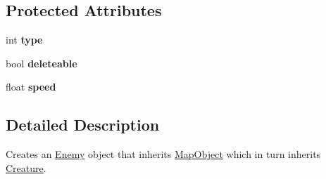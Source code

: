 \subsection*{Protected Attributes}
\begin{DoxyCompactItemize}
\item 
\hypertarget{class_enemy_a787a7113c7a5b1119ac3945fb1fb2956}{int {\bfseries type}}\label{class_enemy_a787a7113c7a5b1119ac3945fb1fb2956}

\item 
\hypertarget{class_enemy_adcb5629c5c048d9a04125cb1b0c911ef}{bool {\bfseries deleteable}}\label{class_enemy_adcb5629c5c048d9a04125cb1b0c911ef}

\item 
\hypertarget{class_enemy_a98766d083fc49e746a37d0dc69be09e0}{float {\bfseries speed}}\label{class_enemy_a98766d083fc49e746a37d0dc69be09e0}

\end{DoxyCompactItemize}


\subsection{Detailed Description}
Creates an \hyperlink{class_enemy}{Enemy} object that inherits \hyperlink{class_map_object}{Map\+Object} which in turn inherits \hyperlink{class_creature}{Creature}. 

